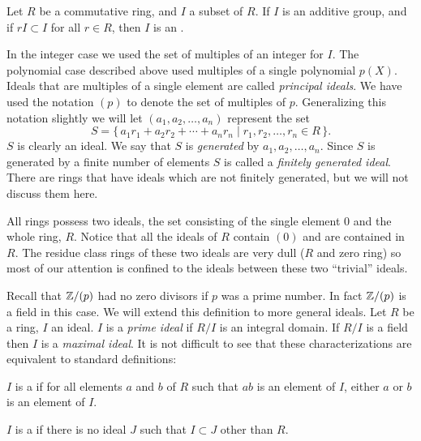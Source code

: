 \begin{definition}
Let $R$ be a commutative ring, and $I$ a subset of $R$.  If $I$ is an
additive group, and if $rI \subset I$ for all $r \in R$, then $I$ is
an .
\end{definition}

 
In the integer case we used the set of multiples of an integer for
$I$.  The polynomial case described above used multiples of a single
polynomial $p(X)$.  Ideals that are multiples of a single element are
called {\em principal ideals\/}.  We have used the notation $(p)$ to
denote the set of multiples of $p$.  Generalizing this notation
slightly we will let $(a_1, a_2, \ldots, a_n)$ represent the set
\[
S = \{\, a_1 r_1 + a_2 r_2 + \cdots + a_n r_n 
        \mid r_1, r_2, \ldots, r_n \in R \,\}.
\]
$S$ is clearly an ideal. We say that $S$ is {\em generated} by $a_1,
a_2, \ldots, a_n$.  Since $S$ is generated by a finite number of
elements $S$ is called a {\em finitely generated ideal\/}.  There are
rings that have ideals which are not finitely generated, but we will
not discuss them here.  

All rings possess two ideals, the set consisting of the single element $0$
and the whole ring, $R$.  Notice that all the ideals of $R$ contain $(0)$
and are contained in $R$.  The residue class rings of these two ideals are
very dull ($R$ and zero ring) so most of our attention is confined to the
ideals between these two ``trivial'' ideals.

Recall that $\mathbb{Z}/(p)$ had no zero divisors if $p$ was a prime number.  In
fact $\mathbb{Z}/(p)$ is a field in this case.  We will extend
this definition to more general ideals.  Let $R$ be a ring, $I$ an ideal.
$I$ is a {\em prime ideal} if $R/I$ is an integral domain.  If $R/I$ is a
field then $I$ is a {\em maximal ideal\/}.  It is not difficult to see that
these characterizations are equivalent to standard definitions:

\begin{definition}
 $I$ is a  if for all elements $a$ and $b$
of $R$ such that $ab$ is an element of $I$, either $a$ or $b$ is an
element of $I$.
\end{definition}

\begin{definition}
$I$ is a  if there is no ideal $J$ such that $I
\subset J$ other than $R$.
\end{definition}

